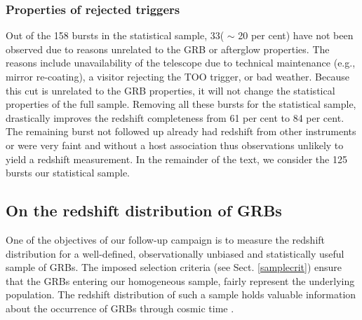\documentclass{aa}    %
\begin{document}
\subsubsection{Properties of rejected triggers} \label{badbursts}

Out of the 158 bursts in the statistical sample, 33( $\sim$ 20 per cent) have
not been observed due to reasons unrelated to the GRB or afterglow properties.
The reasons include unavailability of the telescope due to technical maintenance
(e.g., mirror re-coating), a visitor rejecting the TOO trigger, or bad weather.
Because this cut is unrelated to the GRB properties, it will not change the
statistical properties of the full sample. Removing all these bursts for the
statistical sample, drastically improves the redshift completeness from 61 per
cent to 84 per cent. The remaining burst not followed up already had redshift
from other instruments or were very faint and without a host association thus
observations unlikely to yield a redshift measurement. In the remainder of the
text, we consider the 125 bursts our statistical sample.

\subsection{On the redshift distribution of GRBs} \label{redshift}

One of the objectives of our follow-up campaign is to measure the redshift
distribution for a well-defined, observationally unbiased and statistically useful
sample of GRBs. The imposed selection criteria (see Sect. \ref{samplecrit})
ensure that the GRBs entering our homogeneous sample, fairly represent the
underlying population. The redshift distribution of such a sample holds valuable
information about the occurrence of GRBs through cosmic time
\citep{Jakobsson2012, Perley2016a}.


\end{document}

